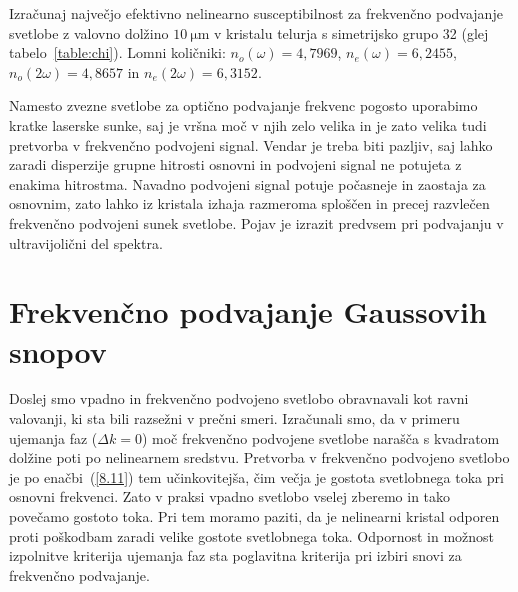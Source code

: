 \begin{naloga}
Izračunaj največjo efektivno nelinearno susceptibilnost za
frekvenčno podvajanje svetlobe z valovno
dolžino $10~\si{\micro\metre}$ v kristalu telurja s simetrijsko grupo 32 (glej tabelo~\ref{table:chi}). 
Lomni količniki: $n_o(\omega) = 4,7969$, 
$n_e(\omega) = 6,2455$, $n_o(2\omega) = 4,8657$ in $n_e(2\omega) = 6,3152$.
\end{naloga}

\begin{remark}
Namesto zvezne svetlobe za optično podvajanje frekvenc pogosto uporabimo kratke laserske sunke, saj je 
vršna moč v njih zelo velika in je zato velika tudi pretvorba v frekvenčno podvojeni signal.
Vendar je treba biti pazljiv, saj lahko zaradi disperzije grupne hitrosti osnovni in 
podvojeni signal ne potujeta z enakima hitrostma. Navadno podvojeni signal potuje 
počasneje in zaostaja za osnovnim, zato lahko iz kristala izhaja razmeroma sploščen in 
precej razvlečen frekvenčno podvojeni sunek svetlobe. 
Pojav je izrazit predvsem pri podvajanju v
ultravijolični del spektra.
\end{remark}

\section{Frekvenčno podvajanje Gaussovih snopov}
Doslej smo vpadno in frekvenčno podvojeno svetlobo obravnavali kot ravni valovanji,
ki sta bili razsežni v prečni smeri. Izračunali smo, da v primeru 
ujemanja faz ($\Delta k=0$)
moč frekvenčno podvojene svetlobe narašča s kvadratom dolžine poti po nelinearnem
sredstvu. Pretvorba v frekvenčno podvojeno svetlobo je po enačbi~(\ref{8.11}) tem
učinkovitejša, čim večja je gostota svetlobnega toka pri osnovni frekvenci.
Zato v praksi vpadno svetlobo vselej zberemo in tako povečamo gostoto toka. 
Pri tem moramo paziti, da je nelinearni kristal odporen proti poškodbam
zaradi velike gostote svetlobnega toka. Odpornost in možnost izpolnitve kriterija ujemanja 
faz sta poglavitna kriterija pri izbiri snovi za frekvenčno podvajanje. 


